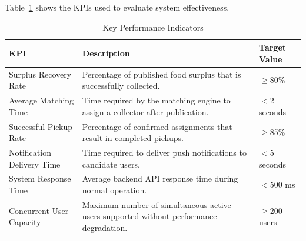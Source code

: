 \documentclass[12pt]{article}
\begin{document}
Table~\ref{tab:kpis} shows the KPIs used to evaluate system effectiveness.

\begin{table}[!t]
\centering
\caption{Key Performance Indicators}
\label{tab:kpis}

\begin{tabular}{p{3.5cm} p{9cm} p{3cm}}
\toprule
\textbf{KPI} & \textbf{Description} & \textbf{Target Value} \\
\midrule

Surplus Recovery Rate & Percentage of published food surplus that is successfully collected. & $\geq$80\% \\

Average Matching Time & Time required by the matching engine to assign a collector after publication. & $<$2 seconds \\

Successful Pickup Rate & Percentage of confirmed assignments that result in completed pickups. & $\geq$85\% \\

Notification Delivery Time & Time required to deliver push notifications to candidate users. & $<$5 seconds \\

System Response Time & Average backend API response time during normal operation. & $<$500 ms \\

Concurrent User Capacity & Maximum number of simultaneous active users supported without performance degradation. & $\geq$200 users \\

\bottomrule
\end{tabular}

\end{table}
\end{document}
